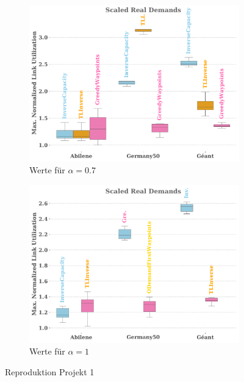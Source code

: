 \begin{figure}
\begin{subfigure}{0.45\textwidth}
                \label{fig:reproduktion_project_1_a=0.5}
            \end{subfigure}
            \begin{subfigure}{0.45\textwidth}
                \centering
                \includegraphics[width=1\linewidth]{Report/bilder/reproduktion/projekt1/real_demands alpha_0,7.pdf}
                \caption{Werte für $\alpha = 0.7$}
                \label{fig:reproduktion_project_1_a=0.7}
            \end{subfigure}
            \begin{subfigure}{0.45\textwidth}
                \centering
                \includegraphics[width=1\linewidth]{Report/bilder/reproduktion/projekt1/real_demands.pdf}
                \caption{Werte für $\alpha = 1$}
                \label{fig:reproduktion_project_1_a=1}
            \end{subfigure}
            
            \caption{Reproduktion Projekt 1}
            \label{fig:reproduktion_project_1}
        \end{figure}

